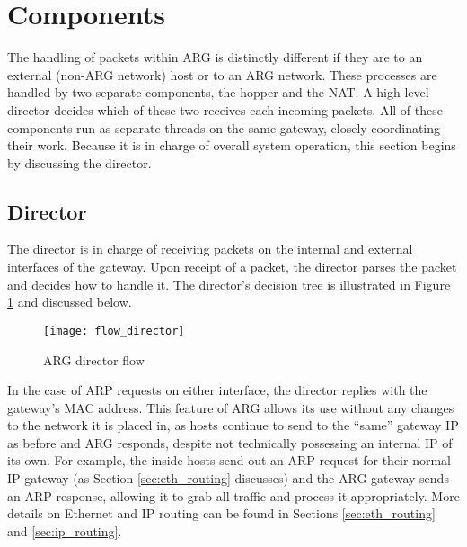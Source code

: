 
\section{Components}
\label{sec:arg_components}
The handling of packets within ARG is distinctly different if they are to an external (non-ARG network) host or to an ARG network. These processes are handled by two separate components, the hopper and the NAT. A high-level director decides which of these two receives each incoming packets. All of these components run as separate threads on the same gateway, closely coordinating their work. Because it is in charge of overall system operation, this section begins by discussing the director.

\subsection{Director}
\label{sec:arg_director}
\par The director is in charge of receiving packets on the internal and external interfaces of the gateway. Upon receipt of a packet, the director parses the packet and decides how to handle it. The director's decision tree is illustrated in Figure \ref{fig:arg_director_flow} and discussed below.

\begin{figure}
\caption{\ac{ARG} director flow}
\label{fig:arg_director_flow}
\centering
\texttt{[image: flow\_director]}
\end{figure}

\par In the case of \ac{ARP} requests on either interface, the director replies with the gateway's \ac{MAC} address. This feature of \ac{ARG} allows its use without any changes to the network it is placed in, as hosts continue to send to the ``same'' gateway IP as before and \ac{ARG} responds, despite not technically possessing an internal \ac{IP} of its own. For example, the inside hosts send out an \ac{ARP} request for their normal \ac{IP} gateway (as Section \ref{sec:eth_routing} discusses) and the \ac{ARG} gateway sends an \ac{ARP} response, allowing it to grab all traffic and process it appropriately. More details on Ethernet and \ac{IP} routing can be found in Sections \ref{sec:eth_routing} and \ref{sec:ip_routing}.

